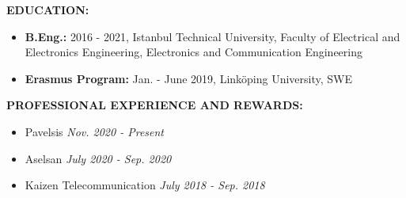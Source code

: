 \textbf{EDUCATION:}
\vspace{-3mm}
\begin{itemize}
  \item \textbf{B.Eng.:} 2016 - 2021, Istanbul Technical University, Faculty of Electrical and Electronics Engineering, Electronics and Communication Engineering
  \item \textbf{Erasmus Program:} Jan. - June 2019, Linköping University, SWE
\end{itemize}

\textbf{PROFESSIONAL EXPERIENCE AND REWARDS:}
\vspace{-3mm}
\begin{itemize}
  \item Pavelsis \hfill \textit{Nov. 2020 - Present}
  \item Aselsan \hfill \textit{July 2020 - Sep. 2020}
  \item Kaizen Telecommunication \hfill \textit{July 2018 - Sep. 2018}
\end{itemize}


\vspace{-3mm}
